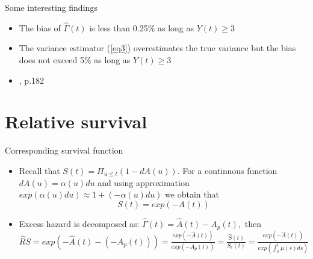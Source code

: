 \documentclass{beamer}
\begin{document}
\begin{frame}{Some interesting findings}
\begin{itemize}
    \item The bias of $\hat\Gamma(t)$ is less than 0.25\% as long as $Y(t) \geq 3$
    \item The variance estimator (\ref{eq3}) overestimates the true variance but the bias does not exceed 5\%  as long as $Y(t) \geq 3$ 
    \item \cite{andersen}, p.182
\end{itemize} 
   
\end{frame}




\section{Relative survival}
\begin{frame}{Corresponding survival function}
\begin{itemize}
\item Recall that
$S(t) = \Pi_{u \leq t}(1-dA(u))$.
\newline
For a continuous function $dA(u) = \alpha(u)du$ and using approximation $exp(\alpha(u)du) \approx 1+ (-\alpha(u)du)$ we obtain that 
$$S(t) = exp(-A(t))$$
\item Excess hazard is decomposed as: $\hat\Gamma(t) = \hat A(t) - A_p(t),$ then 
\newline
$\hat RS = exp(-\hat A(t) - (-A_p(t))) = \frac{exp(-\hat A(t))}{exp(-A_p(t))} = \frac{\hat S(t)}{S_e(t)} =\frac{exp(-\hat A(t))}{exp(\int_0^t \bar \mu (s) ds)} $ 
\end{itemize}
\end{frame}
\end{document}

